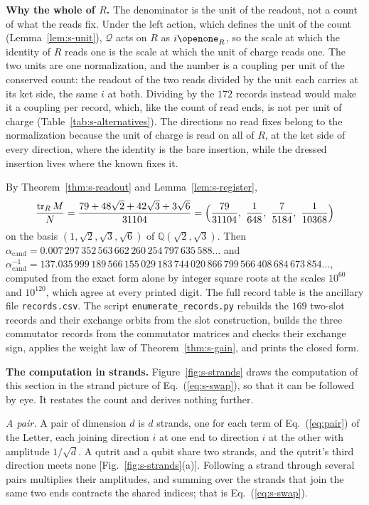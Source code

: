 \textbf{Why the whole of $R$.} The denominator is the unit of the readout, not a count of what the reads fix. Under the left action, which defines the unit of the count (Lemma~\ref{lem:s-unit}), $\mathcal{Q}$ acts on $R$ as $i\openone_{R}$, so the scale at which the identity of $R$ reads one is the scale at which the unit of charge reads one. The two units are one normalization, and the number is a coupling per unit of the conserved count: the readout of the two reads divided by the unit each carries at its ket side, the same $i$ at both. Dividing by the $172$ records instead would make it a coupling per record, which, like the count of read ends, is not per unit of charge (Table~\ref{tab:s-alternatives}). The directions no read fixes belong to the normalization because the unit of charge is read on all of $R$, at the ket side of every direction, where the identity is the bare insertion, while the dressed insertion lives where the known fixes it.

By Theorem~\ref{thm:s-readout} and Lemma~\ref{lem:s-register},
\begin{equation}
\frac{\tr_{R}M}{N}=\frac{79+48\sqrt{2}+42\sqrt{3}+3\sqrt{6}}{31104}=\Big(\frac{79}{31104},\ \frac{1}{648},\ \frac{7}{5184},\ \frac{1}{10368}\Big)
\end{equation}
on the basis $(1,\sqrt{2},\sqrt{3},\sqrt{6})$ of $\mathbb{Q}(\sqrt{2},\sqrt{3})$. Then $\alpha_{\mathrm{cand}}=0.007\,297\,352\,563\,662\,260\,254\,797\,635\,588\ldots$ and $\alpha_{\mathrm{cand}}^{-1}=137.035\,999\,189\,566\,155\,029\,183\,744\,020\,866\,799\,566\,408\,684\,673\,854\ldots$, computed from the exact form alone by integer square roots at the scales $10^{60}$ and $10^{120}$, which agree at every printed digit. The full record table is the ancillary file \texttt{records.csv}. The script \texttt{enumerate\_records.py} rebuilds the $169$ two-slot records and their exchange orbits from the slot construction, builds the three commutator records from the commutator matrices and checks their exchange sign, applies the weight law of Theorem~\ref{thm:s-gain}, and prints the closed form.

\textbf{The computation in strands.} Figure~\ref{fig:s-strands} draws the computation of this section in the strand picture of Eq.~(\ref{eq:s-swap}), so that it can be followed by eye. It restates the count and derives nothing further.



\emph{A pair.} A pair of dimension $d$ is $d$ strands, one for each term of Eq.~(\ref{eq:pair}) of the Letter, each joining direction $i$ at one end to direction $i$ at the other with amplitude $1/\sqrt{d}$. A qutrit and a qubit share two strands, and the qutrit's third direction meets none [Fig.~\ref{fig:s-strands}(a)]. Following a strand through several pairs multiplies their amplitudes, and summing over the strands that join the same two ends contracts the shared indices; that is Eq.~(\ref{eq:s-swap}).


